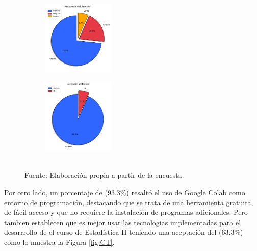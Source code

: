 \documentclass[letter,oneside,12pt,spanish]{report}
\begin{document}
\begin{figure}[h]
	\centering
    \begin{subfigure}
        \centering
        \includegraphics[width=0.38\textwidth]{Figs/Respuesta_Servidor.pdf}
    \end{subfigure}
	\hfill
    \begin{subfigure}
        \centering
        \includegraphics[width=0.38\textwidth]{Figs/lenguaje_preferido.pdf}
    \end{subfigure}
	\label{fig:RL}
	\\ Fuente: Elaboración propia a partir de la encuesta.
\end{figure}

Por otro lado, un porcentaje de ($93.3\%$) resaltó el uso de Google Colab como entorno de programación, destacando que se trata de una herramienta gratuita, de fácil acceso y que no requiere la instalación de programas adicionales.
Pero tambien establecen que es mejor usar las tecnologias implementadas para el desarrrollo de el curso de Estadística II teniendo una aceptación del ($63.3\%$) como lo muestra la Figura \ref{fig:CT}.
\end{document}
